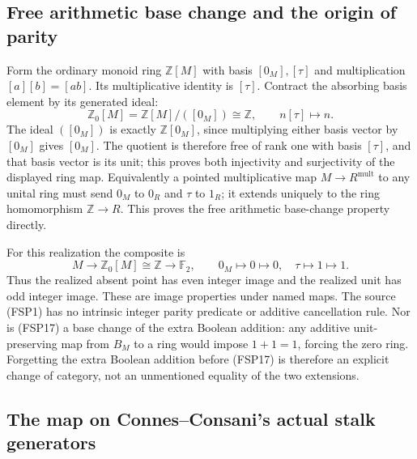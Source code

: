 \subsection{Free arithmetic base change and the origin of parity}

Form the ordinary monoid ring $\mathbb Z[M]$ with basis
$[0_M],[\tau]$ and multiplication $[a][b]=[ab]$.
Its multiplicative identity is $[\tau]$.
Contract the absorbing basis element by its generated ideal:
\begin{equation}\tag{FSP17}
\mathbb Z_0[M]=\mathbb Z[M]/([0_M])\cong\mathbb Z,
\qquad n[\tau]\longmapsto n.
\end{equation}
The ideal $([0_M])$ is exactly $\mathbb Z[0_M]$, since
multiplying either basis vector by $[0_M]$ gives $[0_M]$.
The quotient is therefore free of rank one with basis
$[\tau]$, and that basis vector is its unit;
this proves both injectivity and surjectivity of the
displayed ring map. Equivalently a pointed multiplicative
map $M\to R^{\mathrm{mult}}$ to any unital ring must send
$0_M$ to $0_R$ and $\tau$ to $1_R$; it extends
uniquely to the ring homomorphism $\mathbb Z\to R$.
This proves the free arithmetic base-change property directly.

For this realization the composite is
\begin{equation}\tag{FSP18}
M\longrightarrow\mathbb Z_0[M]\cong\mathbb Z
\longrightarrow\mathbb F_2,
\qquad 0_M\longmapsto0\longmapsto0,
\quad\tau\longmapsto1\longmapsto1.
\end{equation}
Thus the realized absent point has even integer image and
the realized unit has odd integer image. These are image
properties under named maps. The source (FSP1) has no
intrinsic integer parity predicate or additive cancellation
rule. Nor is (FSP17) a base change of the extra Boolean
addition: any additive unit-preserving map from $B_M$ to
a ring would impose $1+1=1$, forcing the zero ring.
Forgetting the extra Boolean addition before (FSP17)
is therefore an explicit change of category, not an
unmentioned equality of the two extensions.

\subsection{The map on Connes--Consani's actual stalk generators}


